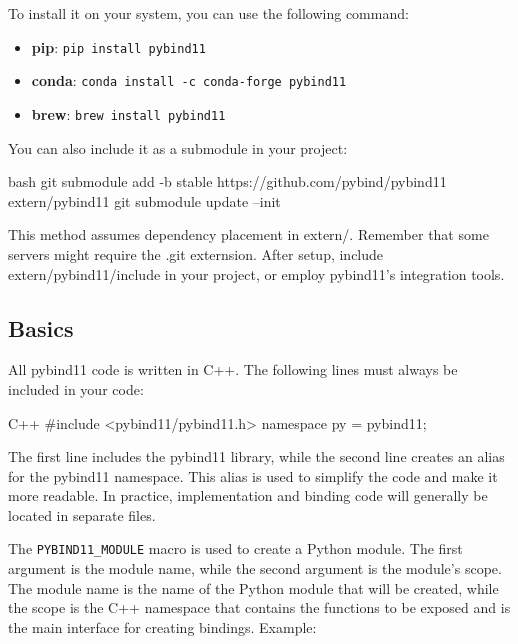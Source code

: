 To install it on your system, you can use the following command:

\begin{itemize}
    \item \textbf{pip}: \phantom{wcoi} \texttt{pip install pybind11}

    \item \textbf{conda}: \phantom{w} \texttt{conda install -c conda-forge pybind11}

    \item \textbf{brew}: \phantom {da.} \texttt{brew install pybind11}

\end{itemize}

You can also include it as a submodule in your project:

\begin{neonlisting}{bash}
git submodule add -b stable https://github.com/pybind/pybind11 extern/pybind11
git submodule update --init 
\end{neonlisting}

This method assumes dependency placement in extern/. Remember that some servers might require the .git externsion.
After setup, include extern/pybind11/include in your project, or employ pybind11's integration tools.

\subsection{Basics}

All pybind11 code is written in C++. The following lines must always be included in your code:

\begin{neonlisting}[language=C++]{C++}
#include <pybind11/pybind11.h>
namespace py = pybind11;
\end{neonlisting}

The first line includes the pybind11 library, while the second line creates an alias for the pybind11 namespace. This alias is used to simplify the code and make it more readable.
In practice, implementation and binding code will generally be located in separate files.

The \texttt{PYBIND11\_MODULE} macro is used to create a Python module. The first argument is the module name, while the second argument is the module's scope. The module name is the name of the Python module that will be created, while the scope is the C++ namespace that contains the functions to be exposed and is the main interface for creating bindings.
Example:

